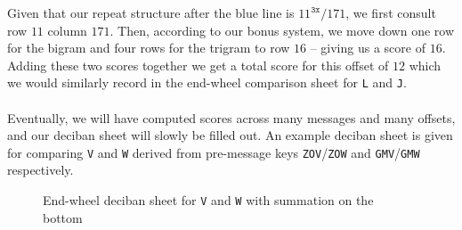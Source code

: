 \noindent Given that our repeat structure after the blue line is
$11^\texttt{3x}/171$, we first consult row $11$ column $171$. Then,
according to our bonus system, we move down one row for the bigram
and four rows for the trigram to row $16$ -- giving us a score of
$16$. Adding these two scores together we get a total score for
this offset of $12$ which we would similarly record in the
end-wheel comparison sheet for \texttt{L} and \texttt{J}.
\\\\Eventually, we will have computed scores across many messages
and many offsets, and our deciban sheet will slowly be filled
out. An example deciban sheet is given for comparing \texttt{V}
and \texttt{W} derived from pre-message keys
\texttt{ZOV}/\texttt{ZOW} and \texttt{GMV}/\texttt{GMW} respectively.
\begin{figure}[H]
  \begin{center}
  \end{center}

  \caption{End-wheel deciban sheet for \texttt{V} and \texttt{W} with
  summation on the bottom~\cite[Section 5.6]{Hosgood2007}}
\end{figure}
